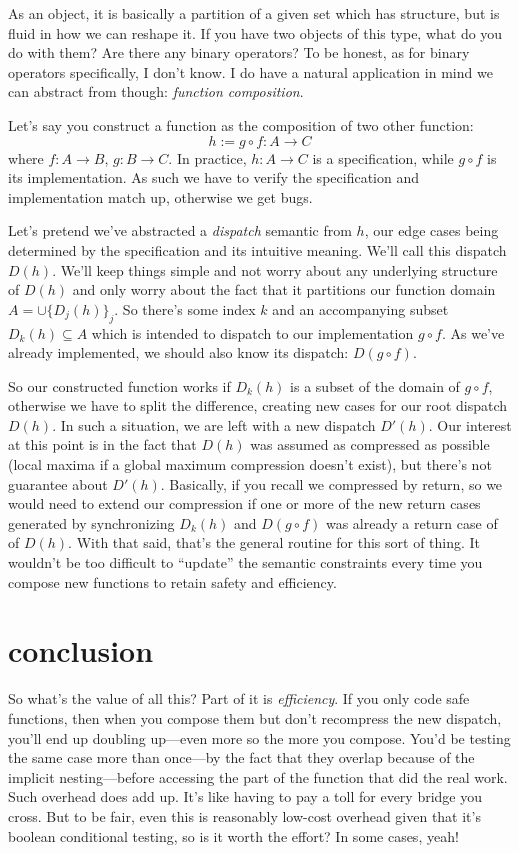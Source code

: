 \documentclass[twoside]{article}
\begin{document}
As an object, it is basically a partition of a given set which has structure, but is fluid in how we can
reshape it. If you have two objects of this type, what do you do with them? Are there any binary operators?
To be honest, as for binary operators specifically, I don't know. I do have a natural application in mind
we can abstract from though: \emph{function composition}.

Let's say you construct a function as the composition of two other function:
$$ h:=g\circ f:A\to C $$
where $ f:A\to B $, $ g:B\to C $. In practice, $ h:A\to C $ is a specification, while $ g\circ f $ is its
implementation. As such we have to verify the specification and implementation match up, otherwise we get bugs.

Let's pretend we've abstracted a \emph{dispatch} semantic from $ h $, our edge cases being determined
by the specification and its intuitive meaning. We'll call this dispatch $ D(h) $. We'll keep things simple
and not worry about any underlying structure of $ D(h) $ and only worry about the fact that it partitions
our function domain $ A=\cup \{D_j(h)\}_j $. So there's some index $ k $ and an accompanying subset
$ D_k(h)\subseteq A $ which is intended to dispatch to our implementation $ g\circ f $. As we've already
implemented, we should also know its dispatch: $ D(g\circ f) $.

So our constructed function works if $ D_k(h) $ is a subset of the domain of $ g\circ f $, otherwise we
have to split the difference, creating new cases for our root dispatch $ D(h) $. In such a situation, we are left
with a new dispatch $ D'(h) $.  Our interest at this point is in the fact that $ D(h) $ was assumed as compressed
as possible (local maxima if a global maximum compression doesn't exist), but there's not guarantee about $ D'(h) $.
Basically, if you recall we compressed by return, so we would need to extend our compression if one or more of the
new return cases generated by synchronizing $ D_k(h) $ and $ D(g\circ f) $ was already a return case of of $ D(h) $.
With that said, that's the general routine for this sort of thing. It wouldn't be too difficult to ``update''
the semantic constraints every time you compose new functions to retain safety and efficiency.

\section*{conclusion}

So what's the value of all this? Part of it is \emph{efficiency}. If you only code safe functions,
then when you compose them but don't recompress the new dispatch, you'll end up doubling up---even more
so the more you compose. You'd be testing the same case more than once---by the fact that they overlap because
of the implicit nesting---before accessing the part of the function that did the real work. Such overhead does
add up. It's like having to pay a toll for every bridge you cross. But to be fair, even this is reasonably
low-cost overhead given that it's boolean conditional testing, so is it worth the effort? In some cases, yeah!
\end{document}
